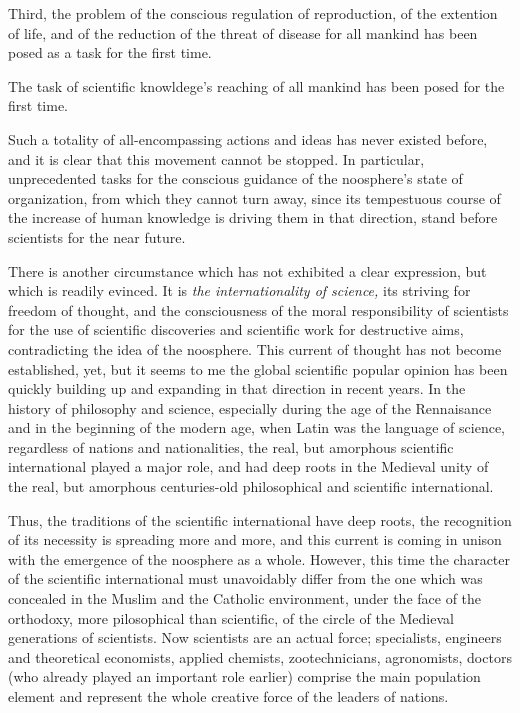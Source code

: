 Third, the problem of the conscious regulation of reproduction, of the
extention of life, and of the reduction of the threat of disease for all
mankind has been posed as a task for the first time.

The task of scientific knowldege's reaching of all mankind has been posed for
the first time.

Such a totality of all-encompassing actions and ideas has never existed before,
and it is clear that this movement cannot be stopped.  In particular,
unprecedented tasks for the conscious guidance of the noosphere's state of
organization, from which they cannot turn away, since its tempestuous course of
the increase of human knowledge is driving them in that direction, stand before
scientists for the near future.

There is another circumstance which has not exhibited a clear expression, but
which is readily evinced.  It is \emph{the internationality of science,} its
striving for freedom of thought, and the consciousness of the moral
responsibility of scientists for the use of scientific discoveries and
scientific work for destructive aims, contradicting the idea of the noosphere.
This current of thought has not become established, yet, but it seems to me the
global scientific popular opinion has been quickly building up and expanding in
that direction in recent years.  In the history of philosophy and science,
especially during the age of the Rennaisance and in the beginning of the modern
age, when Latin was the language of science, regardless of nations and
nationalities, the real, but amorphous scientific
international played a major role, and had
deep roots in the Medieval unity of the real, but amorphous centuries-old
philosophical and scientific international.

Thus, the traditions of the scientific international have deep roots, the
recognition of its necessity is spreading more and more, and this current is
coming in unison with the emergence of the noosphere as a whole.  However, this
time the character of the scientific international must unavoidably differ from
the one which was concealed in the Muslim and the Catholic environment, under
the face of the orthodoxy, more pilosophical than scientific, of the circle of
the Medieval generations of scientists.  Now scientists are an actual force;
specialists, engineers and theoretical economists, applied chemists,
zootechnicians, agronomists, doctors (who already played an important role
earlier) comprise the main population element and represent the whole creative
force of the leaders of nations.

